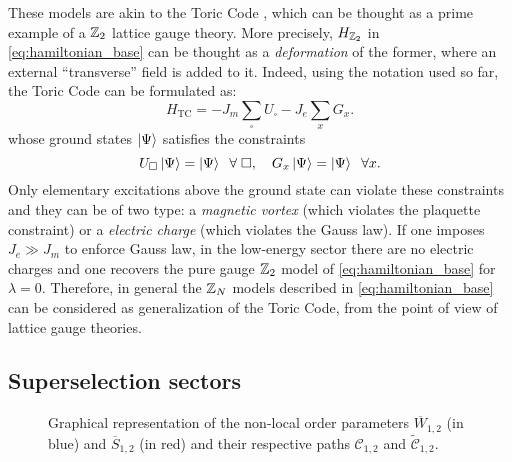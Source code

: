 These models are akin to the Toric Code \cite{kitaev2003fault}, which can be thought as a prime example of a $\mathbb{Z}_2$ lattice gauge theory.
More precisely, $H_{\mathbb{Z}_2}$ in \eqref{eq:hamiltonian_base} can be thought as a \emph{deformation} of the former, where an external ``transverse'' field is added to it.
Indeed, using the notation used so far, the Toric Code can be formulated as:
\begin{equation}
    H_{\text{TC}} = - J_m \sum_{\square} U_{\square} - J_e \sum_{x} G_x.
    \label{eq:hamiltoniana_toric_code}
\end{equation}
whose ground states $\ket{\Psi}$ satisfies the constraints
\begin{equation}
    U_{\square} \ket{\Psi} = \ket{\Psi} \;\; \forall \; \square, \quad
    G_x \ket{\Psi} = \ket{\Psi} \;\; \forall x.
    \label{eq:constraints_gs_toric_code}
\end{equation}
Only elementary excitations above the ground state can violate these constraints and they can be of two type: a \emph{magnetic vortex} (which violates the plaquette constraint) or a \emph{electric charge} (which violates the Gauss law).
If one imposes $J_e \gg J_m$ to enforce Gauss law, in the low-energy sector there are no electric charges and one recovers the pure gauge $\mathbb{Z}_2$ model of \eqref{eq:hamiltonian_base} for $\lambda = 0$.
Therefore, in general the $\mathbb{Z}_N$ models described in \eqref{eq:hamiltonian_base} can be considered as generalization of the Toric Code, from the point of view of lattice gauge theories.


\subsection{Superselection sectors}
\label{sub:superselection_sectors}



\begin{figure}[t]
    \centering
    
    \caption{Graphical representation of the non-local order parameters $\overline{W}_{1,2}$ (in blue) and $\overline{S}_{1,2}$ (in red) and their respective paths $\mathcal{C}_{1,2}$ and $\tilde{\mathcal{C}}_{1,2}$.}
    \label{fig:nonlocal_operators}
\end{figure}

